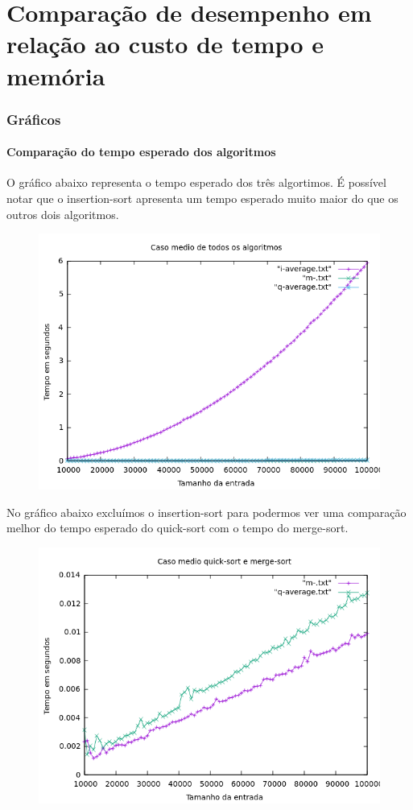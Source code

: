 \chapter{Comparação de desempenho em relação ao custo de tempo e memória}
\subsection{Gráficos}
\subsubsection{Comparação do tempo esperado dos algoritmos}
O gráfico abaixo representa o tempo esperado dos três algortimos. É possível notar que o insertion-sort apresenta um tempo esperado muito maior do que os outros dois algoritmos.
\begin{figure}[h]
    \centering
    \includegraphics[width=1\linewidth]{Imagens/imq-average.png}
\end{figure}

\newpage
No gráfico abaixo excluímos o insertion-sort para podermos ver uma comparação melhor do tempo esperado do quick-sort com o tempo do merge-sort.
\begin{figure}[h]
    \centering
    \includegraphics[width=1\linewidth]{Imagens/mq-average.png}
\end{figure}

